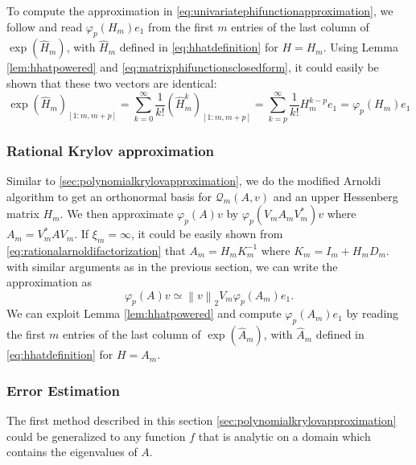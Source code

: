 To compute the approximation in \eqref{eq:univariatephifunctionapproximation}, we follow \cite{niesen2012} and read $\varphi_p(H_m) e_1$
from the first $m$ entries of the last column of $\exp(\hat{H}_m)$, with $\hat{H}_m$ defined in \eqref{eq:hhatdefinition} for $H = H_m$.
Using Lemma \ref{lem:hhatpowered} and \eqref{eq:matrixphifunctionsclosedform}, it could easily be shown that these two vectors are identical:
\begin{equation*}
    \exp(\hat{H}_m)_{[1 : m, m+p]}
    = \sum_{k=0}^{\infty}{\frac{1}{k!} (\hat{H}_m^k)_{[1 : m, m+p]}}
    = \sum_{k=p}^{\infty}{\frac{1}{k!} H_m^{k-p}e_1} = \varphi_p(H_m) e_1
\end{equation*}


\subsubsection{Rational Krylov approximation}
\label{sec:rationalkrylovapproximation}
Similar to \autoref{sec:polynomialkrylovapproximation}, we do the modified Arnoldi algorithm to get an orthonormal
basis for $\mathcal{Q}_m(A, v)$ and an upper Hessenberg matrix $H_m$. We then approximate $\varphi_p(A)v$ by
$\varphi_p(V_m A_m V_m^*)v$ where $A_m = V_m^* A V_m$. If $\xi_m = \infty$, it could be easily shown from
\eqref{eq:rationalarnoldifactorization} that $A_m = H_m K_m^{-1}$ where $K_m = I_m + H_m D_m$. with similar arguments
as in the previous section, we can write the approximation as
\begin{equation}
    \label{eq:rationalkrylovapproximation}
    \varphi_p(A)v \simeq \left\| v \right\|_{2} V_m \varphi_p(A_m) e_1.
\end{equation}
We can exploit Lemma \ref{lem:hhatpowered} and compute $\varphi_p(A_m) e_1$ by reading the first $m$ entries of the
last column of $\exp(\hat{A}_m)$, with $\hat{A}_m$ defined in \eqref{eq:hhatdefinition} for $H = A_m$.

\subsubsection{Error Estimation}
The first method described in this section \autoref{sec:polynomialkrylovapproximation} could be generalized to any
function $f$ that is analytic on a domain which contains the eigenvalues of $A$.

